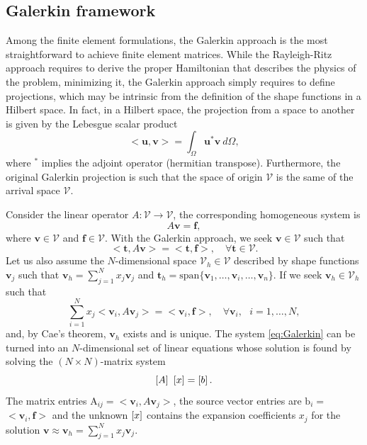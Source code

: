 \subsection{Galerkin framework}

Among the finite element formulations, the Galerkin approach is the most straightforward to achieve finite element matrices. While the Rayleigh-Ritz approach requires to derive the proper Hamiltonian that describes the physics of the problem,  minimizing it, the Galerkin approach simply requires to define projections, which may be intrinsic from the definition of the shape functions in a Hilbert space. In fact, in a Hilbert space, the projection from a space to another is given by the Lebesgue scalar product 
%
$$<\mathbf{u},\mathbf{v}> = \int_\Omega \mathbf{u}^* \mathbf{v} \ d\Omega,$$
%
\noindent where $^*$ implies the adjoint operator (hermitian transpose). Furthermore, the original Galerkin projection is such that the space of origin $\mathcal{V}$ is the same of the arrival space $\mathcal{V}$. 

Consider the linear operator $A : \mathcal{V} \longrightarrow \mathcal{V}$, the corresponding homogeneous system is
$$A \mathbf{v} = \mathbf{f},$$
\noindent where $\mathbf{v} \in \mathcal{V}$ and $\mathbf{f} \in \mathcal{V}$. With the Galerkin approach, we seek $\mathbf{v} \in \mathcal{V}$ such that
$$< \mathbf{t}, A \mathbf{v}> = <\mathbf{t},\mathbf{f}>, \quad \forall \mathbf{t} \in \mathcal{V}.$$
\noindent Let us also assume the $N$-dimensional space $\mathcal{V}_h\in \mathcal{V}$ described by shape functions $\mathbf{v}_j$ such that $\mathbf{v}_h = \sum_{j=1}^N x_j \mathbf{v}_j$ and $\mathbf{t}_h = \mathrm{span}\lbrace{\mathbf{v}_1, \ldots, \mathbf{v}_i, \ldots, \mathbf{v}_n}\rbrace$. If we seek $\mathbf{v}_h \in \mathcal{V}_h$ such that
\begin{equation}
\sum_{i=1}^N x_j < \mathbf{v}_i, A \mathbf{v}_j> = <\mathbf{v}_i,\mathbf{f}>, \quad \forall \mathbf{v}_i, \ \ \ i=1,\ldots,N,
\label{eq:Galerkin}
\end{equation}
%
\noindent and, by Cae's theorem, $\mathbf{v}_h$ exists and is unique. The system \eqref{eq:Galerkin} can be turned into an $N$-dimensional set of linear equations whose solution is found by solving the $(N \times N)$-matrix system
$$ \left[A\right] \ \left[{{x}}\right] = \left[{{b}}\right].$$
The matrix entries $\mathrm{A}_{ij} = < \mathbf{v}_i, A \mathbf{v}_j>$, the source vector entries are $\mathrm{b}_i =$ $<\mathbf{v}_i,\mathbf{f}>$ and the unknown $\left[{{x}}\right]$ contains the expansion coefficients $x_j$ for the solution $\mathbf{v} \approx \mathbf{v}_h = \sum_{j=1}^N x_j \mathbf{v}_j$.


